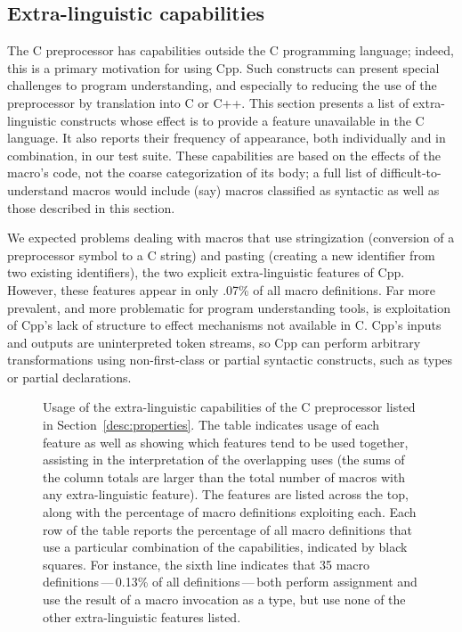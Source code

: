 \documentclass[10pt]{article}
\newcommand{\captionsmall}[1]{\caption[]{\small #1}}
\begin{document}
\subsection{Extra-linguistic capabilities}
\label{sec:extra-linguistic}

The C preprocessor has capabilities outside the C programming language;
indeed, this is a primary motivation for using Cpp.  Such constructs can
present special challenges to program understanding, and especially to
reducing the use of the preprocessor by translation into C or C++.  This
section presents a list of extra-linguistic constructs whose effect is to
provide a feature unavailable in the C language.  It also reports their
frequency of appearance, both individually and in combination, in our test
suite.  These capabilities are based on the effects of the macro's code,
not the coarse categorization of its body; a full list of
difficult-to-understand macros would include (say) macros classified as
syntactic as well as those described in this section.


We expected problems dealing with macros that use stringization (conversion
of a preprocessor symbol to a C string) and pasting (creating a new
identifier from two existing identifiers), the two explicit
extra-linguistic features of Cpp.  However, these features appear in only
.07\% of all macro definitions.  Far more prevalent, and more problematic
for program understanding tools, is exploitation of Cpp's lack of structure
to effect mechanisms not available in C\@.  Cpp's inputs and outputs are
uninterpreted token streams, so Cpp can perform arbitrary transformations
using non-first-class or partial syntactic constructs, such as types or
partial declarations.

\begin{figure}
  \vspace*{.6in}
  {\small\centerline{}}
  
  \captionsmall{Usage of the extra-linguistic capabilities of the C
    preprocessor listed in Section~\ref{desc:properties}.  The table
    indicates usage of each feature as well as showing which features tend
    to be used together, assisting in the interpretation of the overlapping
    uses (the sums of the column totals are larger than the total number of
    macros with any extra-linguistic feature).
    The features are listed across the top, along with the percentage of
    macro definitions exploiting each.  Each row of the table reports the
    percentage of all macro definitions that use a particular combination
    of the capabilities, indicated by black squares.  For instance, the
    sixth line indicates that 35 macro definitions\,---\,0.13\% of all
    definitions\,---\,both perform assignment and use the result of a macro
    invocation as a type, but use none of the other extra-linguistic
    features listed.}

  \label{fig:subset-properties}
\end{figure}
\end{document}
